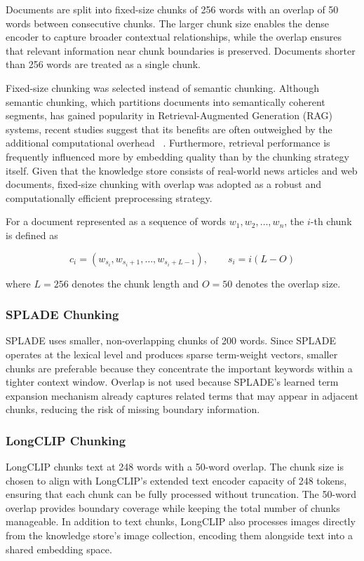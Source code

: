 Documents are split into fixed-size chunks of 256 words with an overlap of 50 words between consecutive chunks. The larger chunk size enables the dense encoder to capture broader contextual relationships, while the overlap ensures that relevant information near chunk boundaries is preserved. Documents shorter than 256 words are treated as a single chunk.


Fixed-size chunking was selected instead of semantic chunking. Although semantic chunking, which partitions documents into semantically coherent segments, has gained popularity in Retrieval-Augmented Generation (RAG) systems, recent studies suggest that its benefits are often outweighed by the additional computational overhead ~\cite{Qu2024Oct}. Furthermore, retrieval performance is frequently influenced more by embedding quality than by the chunking strategy itself. Given that the knowledge store consists of real-world news articles and web documents, fixed-size chunking with overlap was adopted as a robust and computationally efficient preprocessing strategy.


For a document represented as a sequence of words $w_1,w_2,\ldots,w_n$, the $i$-th chunk is defined as

\begin{equation}
c_i =
(w_{s_i}, w_{s_i+1}, \ldots, w_{s_i+L-1}),
\qquad
s_i = i(L-O)
\label{eq:fixed_chunking}
\end{equation}

where $L=256$ denotes the chunk length and $O=50$ denotes the overlap size.

\subsubsection{SPLADE Chunking}

SPLADE uses smaller, non-overlapping chunks of 200 words. Since SPLADE operates at the lexical level and produces sparse term-weight vectors, smaller chunks are preferable because they concentrate the important keywords within a tighter context window. Overlap is not used because SPLADE's learned term expansion mechanism already captures related terms that may appear in adjacent chunks, reducing the risk of missing boundary information.

\subsubsection{LongCLIP Chunking}

LongCLIP chunks text at 248 words with a 50-word overlap. The chunk size is chosen to align with LongCLIP's extended text encoder capacity of 248 tokens, ensuring that each chunk can be fully processed without truncation. The 50-word overlap provides boundary coverage while keeping the total number of chunks manageable. In addition to text chunks, LongCLIP also processes images directly from the knowledge store's image collection, encoding them alongside text into a shared embedding space.

